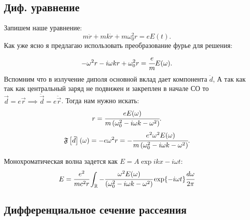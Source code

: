 \documentclass[a4paper]{article}
\newcommand{\inner}[1]{\left( #1 \right)}
\newcommand{\insqr}[1]{\left[ #1 \right]}
\newcommand{\re}{\mathbb{R}}
\numberwithin{equation}{section}
\begin{document}
\subsection{Диф. уравнение}
Запишем наше уравнение:
\begin{equation}
    m \ddot r + mk\dot r + m\omega_0^2r = e E(t).
\end{equation}
Как уже ясно я предлагаю использовать преобразование фурье для решения:
\begin{equation}
    -\omega^2 r - i\omega kr + \omega_0^2r = \cfrac{e}{m} E(\omega).
\end{equation}
Вспомним что в излучение диполя основной вклад дает компонента $\ddot d$,
А так как так как центральный заряд не подвижен и закреплен в начале СО 
то $\vec d = e\vec r \implies \ddot{{\vec{d}}} = e\ddot{\vec{r}}$. Тогда 
нам нужно искать:
\begin{equation}
    r = \cfrac{eE(\omega)}{m\inner{\omega_0^2 - i\omega k - \omega^2 }} .
\end{equation}
\begin{equation}
    \mathfrak F \insqr{\ddot d}(\omega)= -e\omega^2 r = -\cfrac{e^2\omega^2E(\omega)}{m\inner{\omega_0^2 - i\omega k - \omega^2 }} .
\end{equation}

Монохроматическая волна задется как $E = A \exp{ikx - i\omega t}$:
\begin{equation}
    E = \cfrac{e^2}{mc^2r}\int_\re -\cfrac{\omega^2E(\omega)}{\inner{\omega_0^2 - i\omega k - \omega^2 }} \exp{-i\omega t} \cfrac{d\omega}{2\pi}
\end{equation}

\subsection{Дифференциальное сечение рассеяния}
\end{document}
